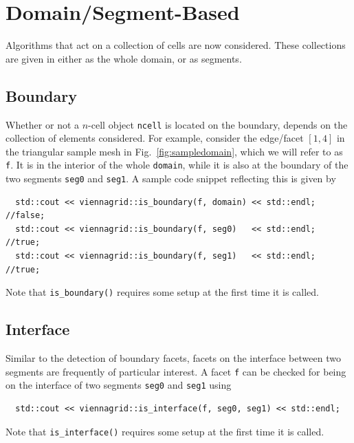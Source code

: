 \section{Domain/Segment-Based}
Algorithms that act on a collection of cells are now considered. These collections are given in {\ViennaGrid} either as the whole domain, or as segments.

 \subsection{Boundary}
 Whether or not a $n$-cell object \lstinline|ncell| is located on the boundary, depends on the collection of elements considered.
 For example, consider the edge/facet $[1,4]$ in the triangular sample mesh in Fig.~\ref{fig:sampledomain}, which we will refer to as \lstinline|f|.
 It is in the interior of the whole \lstinline|domain|, while it is also at the boundary of the two segments \lstinline|seg0| and \lstinline|seg1|.
 A sample code snippet reflecting this is given by
 \begin{lstlisting}
  std::cout << viennagrid::is_boundary(f, domain) << std::endl; //false;
  std::cout << viennagrid::is_boundary(f, seg0)   << std::endl; //true;
  std::cout << viennagrid::is_boundary(f, seg1)   << std::endl; //true;
 \end{lstlisting}
 Note that \lstinline|is_boundary()| requires some setup at the first time it is called.

 

 \subsection{Interface}
  Similar to the detection of boundary facets, facets on the interface between two segments are frequently of particular interest. 
  A facet \lstinline|f| can be checked for being on the interface of two segments \lstinline|seg0| and \lstinline|seg1| using
 \begin{lstlisting}
  std::cout << viennagrid::is_interface(f, seg0, seg1) << std::endl;
 \end{lstlisting}
 Note that \lstinline|is_interface()| requires some setup at the first time it is called.



